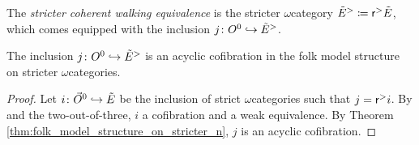 \begin{dfn} 
    The \emph{stricter coherent walking equivalence} is the stricter \( \omega \)\nbd category \( \tilde E^> \coloneqq \mathsf{r}^{>} \tilde E \), which comes equipped with the inclusion \( j \colon O^{0} \hookrightarrow \tilde E^> \).
\end{dfn}

\begin{lem} \label{lem:inclusion_into_stricter_is_equivalence}
    The inclusion \( j \colon O^{0} \hookrightarrow \tilde E^> \) is an acyclic cofibration in the folk model structure on stricter \( \omega \)\nbd categories.
\end{lem}
\begin{proof}
    Let \( i \colon \vec{O}^{0} \hookrightarrow \tilde E \) be the inclusion of strict \( \omega \)\nbd categories such that \( j = \mathsf{r}^{>} i \).
    By \cite[Remark 1.29, Theorem 1.33]{hadzihasanovic2024model} and the two-out-of-three, \( i \) a cofibration and a weak equivalence.
    By Theorem \ref{thm:folk_model_structure_on_stricter_n}, \( j \) is an acyclic cofibration. 
\end{proof}

